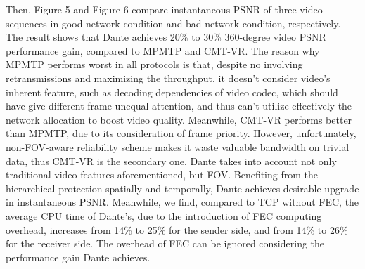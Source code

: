 Then, Figure 5 and Figure 6 compare instantaneous PSNR of three video sequences in good network condition and bad network condition, respectively. The result shows that Dante achieves 20\% to 30\% 360-degree video PSNR performance gain, compared to MPMTP and CMT-VR. The reason why MPMTP performs worst in all protocols is that, despite no involving retransmissions and maximizing the throughput, it doesn't consider video's inherent feature, such as decoding dependencies of video codec, which should have give different frame unequal attention, and thus can't utilize effectively the network allocation to boost video quality. Meanwhile, CMT-VR performs better than MPMTP, due to its consideration of frame priority. However, unfortunately, non-FOV-aware reliability scheme makes it waste valuable bandwidth on trivial data, thus CMT-VR is the secondary one. Dante takes into account not only traditional video features aforementioned, but FOV. Benefiting from the hierarchical protection spatially and temporally, Dante achieves desirable upgrade in instantaneous PSNR. Meanwhile, we find, compared to TCP without FEC, the average CPU time of Dante's, due to the introduction of FEC computing overhead, increases from 14\% to 25\% for the sender side, and from 14\% to 26\% for the receiver side. The overhead of FEC can be ignored considering the performance gain Dante achieves.      